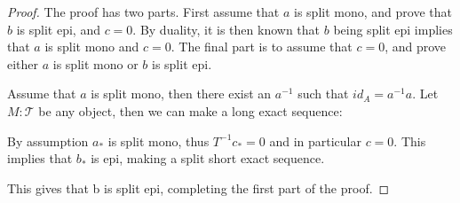 \documentclass[12pt]{article}
\theoremstyle{definition}
\theoremstyle{remark}
\begin{document}
            \begin{proof}
                The proof has two parts. First assume that $a$ is split mono, and prove that $b$ is split epi, and $c = 0$. By duality, it is then known that $b$ being split epi implies that $a$ is split mono and $c = 0$. The final part is to assume that $c = 0$, and prove either $a$ is split mono or $b$ is split epi.

                Assume that $a$ is split mono, then there exist an $a^{-1}$ such that $id_A = a^{-1}a$. Let $M:\mathcal{T}$ be any object, then we can make a long exact sequence:
                \begin{center}
                \end{center}
                By assumption $a_*$ is split mono, thus $T^{-1}c_* = 0$ and in particular $c = 0$. This implies that $b_*$ is epi, making a split short exact sequence.
                \begin{center}
                \end{center}
                This gives that b is split epi, completing the first part of the proof.


\end{proof}
\end{document}
